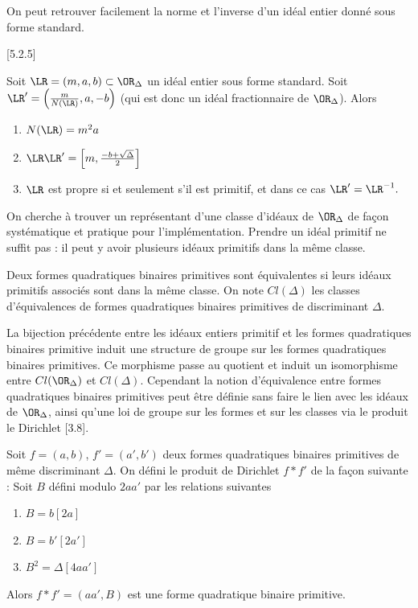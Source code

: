 On peut retrouver facilement la norme et l'inverse d'un idéal entier donné sous forme standard.

\begin{Prop}\cite{Coh00}[5.2.5]
	
	Soit $\LR = (m,a,b)\subset\OR_{\Delta}$ un idéal entier sous forme standard. Soit $\LR' = \left( \frac{m}{N(\LR)},a,-b\right) $ (qui est donc un idéal fractionnaire de $\OR_{\Delta}$). Alors
	\begin{enumerate}
		\item $N(\LR) = m^2a$
		\item $\LR\LR' = \left[ m, \frac{-b + \sqrt{\Delta}}{2}\right] $
		\item $\LR$ est propre si et seulement s'il est primitif, et dans ce cas $\LR' = \LR^{-1}.$
	\end{enumerate}
\end{Prop}

On cherche à trouver un représentant d'une classe d'idéaux de $\OR_{\Delta}$ de façon systématique et pratique pour l'implémentation. Prendre un idéal primitif ne suffit pas : il peut y avoir plusieurs idéaux primitifs dans la même classe. 

\begin{Def}
	Deux formes quadratiques binaires primitives sont équivalentes si leurs idéaux primitifs associés sont dans la même classe. On note $Cl(\Delta)$ les classes d'équivalences de formes quadratiques binaires primitives de discriminant $\Delta$.
\end{Def}

La bijection précédente entre les idéaux entiers primitif et les formes quadratiques binaires primitive induit une structure de groupe sur les formes quadratiques binaires primitives. Ce morphisme passe au quotient et induit un isomorphisme entre $Cl(\OR_{\Delta})$ et $Cl(\Delta)$. Cependant la notion d'équivalence entre formes quadratiques binaires primitives peut être définie sans faire le lien avec les idéaux de $\OR_{\Delta}$, ainsi qu'une loi de groupe sur les formes et sur les classes via le produit le Dirichlet \cite{Cox}[3.8].

\begin{Def}
	Soit $f = (a,b)$, $f' = (a', b')$ deux formes quadratiques binaires primitives de même discriminant $\Delta$. On défini le produit de Dirichlet $f*f'$ de la façon suivante : Soit $B$ défini modulo $2aa'$ par les relations suivantes
	\begin{enumerate}
		\item $B = b [2a]$
		\item $B = b' [2a']$
		\item $B^2 = \Delta [4aa']$
	\end{enumerate}
	Alors $f*f' = (aa', B)$ est une forme quadratique binaire primitive.
\end{Def}

